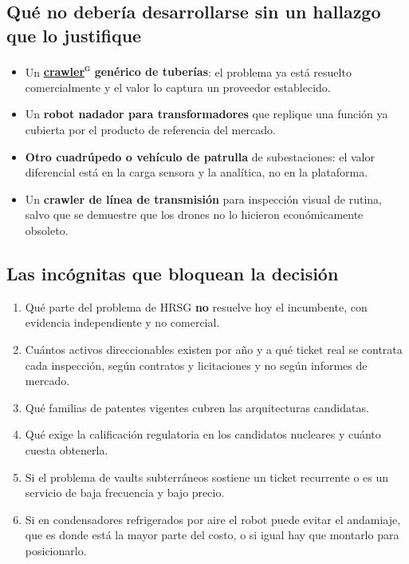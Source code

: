 \documentclass[11pt,a4paper]{article}
\begin{document}
\subsection*{Qué no debería desarrollarse sin un hallazgo que lo justifique}

\begin{itemize}
\item Un \textbf{\hyperlink{g-crawler}{crawler}\textsuperscript{\textsc{g}} genérico de tuberías}: el problema ya está resuelto comercialmente y el valor lo captura un proveedor establecido.
\item Un \textbf{robot nadador para transformadores} que replique una función ya cubierta por el producto de referencia del mercado.
\item \textbf{Otro cuadrúpedo o vehículo de patrulla} de subestaciones: el valor diferencial está en la carga sensora y la analítica, no en la plataforma.
\item Un \textbf{crawler de línea de transmisión} para inspección visual de rutina, salvo que se demuestre que los drones no lo hicieron económicamente obsoleto.
\end{itemize}


\subsection*{Las incógnitas que bloquean la decisión}

\begin{enumerate}
\item Qué parte del problema de HRSG \textbf{no} resuelve hoy el incumbente, con evidencia independiente y no comercial.
\item Cuántos activos direccionables existen por año y a qué ticket real se contrata cada inspección, según contratos y licitaciones y no según informes de mercado.
\item Qué familias de patentes vigentes cubren las arquitecturas candidatas.
\item Qué exige la calificación regulatoria en los candidatos nucleares y cuánto cuesta obtenerla.
\item Si el problema de vaults subterráneos sostiene un ticket recurrente o es un servicio de baja frecuencia y bajo precio.
\item Si en condensadores refrigerados por aire el robot puede evitar el andamiaje, que es donde está la mayor parte del costo, o si igual hay que montarlo para posicionarlo.
\end{enumerate}
\end{document}
